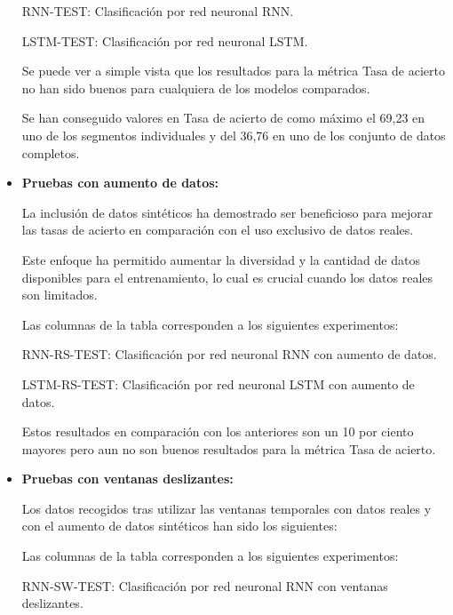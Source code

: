 \begin{itemize}
	RNN-TEST: Clasificación por red neuronal RNN.

	LSTM-TEST: Clasificación por red neuronal LSTM.

	Se puede ver a simple vista que los resultados para la métrica Tasa de acierto no han sido buenos para cualquiera de los modelos comparados.

	Se han conseguido valores en Tasa de acierto de como máximo el 69,23 en uno de los segmentos individuales y del 36,76 en uno de los conjunto de datos completos.


	\item
	\textbf{Pruebas con aumento de datos:}
	
	La inclusión de datos sintéticos ha demostrado ser beneficioso para mejorar las tasas de acierto en comparación con el uso exclusivo de datos reales. 
	
	Este enfoque ha permitido aumentar la diversidad y la cantidad de datos disponibles para el entrenamiento, lo cual es crucial cuando los datos reales son limitados.
	
	

	Las columnas de la tabla corresponden a los siguientes experimentos:

	RNN-RS-TEST: Clasificación por red neuronal RNN con aumento de datos.

	LSTM-RS-TEST: Clasificación por red neuronal LSTM con aumento de datos.

	Estos resultados en comparación con los anteriores son un 10 por ciento mayores pero aun no son buenos resultados para la métrica Tasa de acierto.
	

	\item
	\textbf{Pruebas con ventanas deslizantes:}
	
	Los datos recogidos tras utilizar las ventanas temporales con datos reales y con el aumento de datos sintéticos han sido los siguientes:
	




	Las columnas de la tabla corresponden a los siguientes experimentos:

	RNN-SW-TEST: Clasificación por red neuronal RNN con ventanas deslizantes.


\end{itemize}
